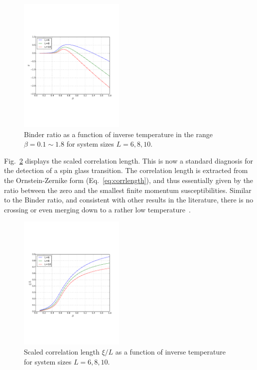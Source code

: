 \documentclass[aps,prb,twocolumn,showpacs,superscriptaddress]{revtex4}
\begin{document}
\begin{figure}[ht]
  \includegraphics[width=0.45\textwidth]{img/binder.pdf}%
  \caption{\label{fig:b-h0} Binder ratio as a function of inverse temperature in the
range  $\beta=0.1\sim1.8$ for system sizes $L=6,8,10$.}
\label{fig:Binder}
\end{figure}

Fig.~\ref{fig:c-h0} displays the scaled correlation length. This is now a standard 
diagnosis for the detection of a spin glass transition. The correlation length is 
extracted from the Ornstein-Zernike form (Eq.~\ref{eq:corrlength}), and thus essentially given by the ratio 
between the zero and the smallest finite momentum susceptibilities. 
Similar to the Binder ratio, and consistent with other results in the literature, 
there is no crossing or even merging down to a rather low temperature~\cite{Young-Katzgraber2004}.

\begin{figure}[ht]
  \includegraphics[width=0.45\textwidth]{img/corr.pdf}%
  \caption{\label{fig:c-h0} Scaled correlation length $\xi/L$ as a function of inverse temperature for system sizes $L=6,8,10$.  }
\end{figure}
\end{document}
